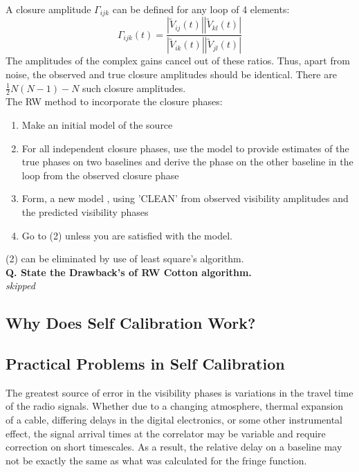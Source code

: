 \documentclass[10pt]{report}
\newcommand{\tbf}[1]{\textbf{#1}}
\newcommand{\tit}[1]{\textit{#1}}
\begin{document}
A closure amplitude $\Gamma_{ijk}$ can be defined for any loop of 4 elements:
\begin{equation}
\Gamma_{ijk}(t)=\frac{|\tilde{V}_{ij}(t)||\tilde{V}_{kl}(t)|}{|\tilde{V}_{ik}(t)||\tilde{V}_{jl}(t)|}
\end{equation}
The amplitudes of the complex gains cancel out of these ratios. Thus, apart from noise, the observed and true closure amplitudes should be identical. There are $\frac{1}{2}N(N-1)-N$ such closure amplitudes.\\

The RW method to incorporate the closure phases:
\begin{enumerate}
\item Make an initial model of the source
\item For all independent closure phases, use the model to provide estimates of the true phases on two baselines and derive the phase on the other baseline in the loop from the observed closure phase
\item Form, a new model , using 'CLEAN' from observed visibility amplitudes and the predicted visibility phases
\item Go to (2) unless you are satisfied with the model.
\end{enumerate}
(2) can be eliminated by use of least square's algorithm.\\

\tbf{Q. State the Drawback's of RW Cotton algorithm.}\\

\tit{skipped}

\subsection{Why Does Self Calibration Work?}

\subsection{Practical Problems in Self Calibration}


The greatest source of error in the visibility phases is variations in the travel time of the radio signals.  Whether due to a changing atmosphere, thermal expansion of a cable, differing delays in the digital electronics, or some other instrumental effect, the signal arrival times at the correlator may be variable and require correction on short timescales.  As a result, the relative delay on a baseline may not be exactly the same as what was calculated for the fringe function. 
\\
\end{document}
